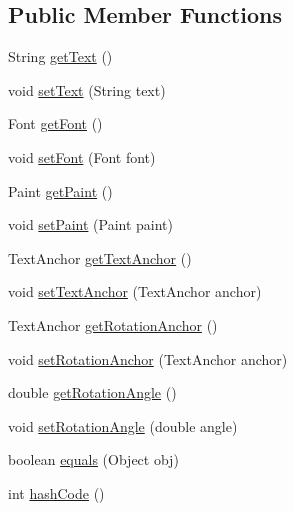 \subsection*{Public Member Functions}
\begin{DoxyCompactItemize}
\item 
String \mbox{\hyperlink{classorg_1_1jfree_1_1chart_1_1annotations_1_1_text_annotation_a74805ae428257122d1ebb45fd7f938cc}{get\+Text}} ()
\item 
void \mbox{\hyperlink{classorg_1_1jfree_1_1chart_1_1annotations_1_1_text_annotation_a5f98bba3af3dff49aec055bea1737951}{set\+Text}} (String text)
\item 
Font \mbox{\hyperlink{classorg_1_1jfree_1_1chart_1_1annotations_1_1_text_annotation_aea2ca0640ab40720ec3610f5422b137c}{get\+Font}} ()
\item 
void \mbox{\hyperlink{classorg_1_1jfree_1_1chart_1_1annotations_1_1_text_annotation_a28b229e51ba0570b868db3c79f326d23}{set\+Font}} (Font font)
\item 
Paint \mbox{\hyperlink{classorg_1_1jfree_1_1chart_1_1annotations_1_1_text_annotation_a2ee970d0b9a52455ed0054b120055620}{get\+Paint}} ()
\item 
void \mbox{\hyperlink{classorg_1_1jfree_1_1chart_1_1annotations_1_1_text_annotation_add0e38c4b928b8442d789f69f81beef1}{set\+Paint}} (Paint paint)
\item 
Text\+Anchor \mbox{\hyperlink{classorg_1_1jfree_1_1chart_1_1annotations_1_1_text_annotation_a12fccb5d729ac02e696948e7bf0c1c3e}{get\+Text\+Anchor}} ()
\item 
void \mbox{\hyperlink{classorg_1_1jfree_1_1chart_1_1annotations_1_1_text_annotation_a8a4d5edc3f5f6b8fecaa450f4b56c087}{set\+Text\+Anchor}} (Text\+Anchor anchor)
\item 
Text\+Anchor \mbox{\hyperlink{classorg_1_1jfree_1_1chart_1_1annotations_1_1_text_annotation_ab97800ba02a4576842f56a1f3b665f53}{get\+Rotation\+Anchor}} ()
\item 
void \mbox{\hyperlink{classorg_1_1jfree_1_1chart_1_1annotations_1_1_text_annotation_a1d43efc7fe9a628e089ded8bc447564b}{set\+Rotation\+Anchor}} (Text\+Anchor anchor)
\item 
double \mbox{\hyperlink{classorg_1_1jfree_1_1chart_1_1annotations_1_1_text_annotation_ade23fab527551f75375563c2a138e3c0}{get\+Rotation\+Angle}} ()
\item 
void \mbox{\hyperlink{classorg_1_1jfree_1_1chart_1_1annotations_1_1_text_annotation_ac629e4dd9695447f5a41e87a65436af7}{set\+Rotation\+Angle}} (double angle)
\item 
boolean \mbox{\hyperlink{classorg_1_1jfree_1_1chart_1_1annotations_1_1_text_annotation_a5f6d8925c32861cc5798ad3d0bebcf59}{equals}} (Object obj)
\item 
int \mbox{\hyperlink{classorg_1_1jfree_1_1chart_1_1annotations_1_1_text_annotation_a18a9671a3ab06e93a14e9502c912d389}{hash\+Code}} ()
\end{DoxyCompactItemize}
